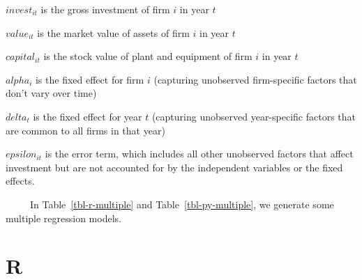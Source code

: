 \documentclass[
  letterpaper,
  DIV=11,
  numbers=noendperiod]{scrreprt}
\begin{document}
\(invest_{it}\) is the gross investment of firm \(i\) in year \(t\)

\(value_{it}\) is the market value of assets of firm \(i\) in year \(t\)

\(capital_{it}\) is the stock value of plant and equipment of firm \(i\)
in year \(t\)

\(alpha_{i}\) is the fixed effect for firm \(i\) (capturing unobserved
firm-specific factors that don't vary over time)

\(delta_{t}\) is the fixed effect for year \(t\) (capturing unobserved
year-specific factors that are common to all firms in that year)

\(epsilon_{it}\) is the error term, which includes all other unobserved
factors that affect investment but are not accounted for by the
independent variables or the fixed effects.

~~~~~In Table~\ref{tbl-r-multiple} and Table~\ref{tbl-py-multiple}, we
generate some multiple regression models.

\section{R}
\end{document}

